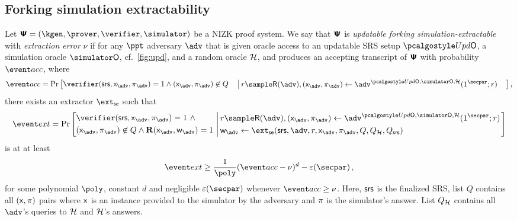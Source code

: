 \subsection{Forking simulation extractability}
\begin{definition}
	\label{def:updsimext}
	Let $\ps = (\kgen, \prover, \verifier, \simulator)$ be a
	NIZK proof system. We say that $\bm{\mathsf{\Psi}}$ is \emph{updatable forking
		simulation-extractable} with \emph{extraction error} $\nu$ if for any $\ppt$
	adversary $\adv$ that is given oracle access to an updatable SRS setup $\initU$, a simulation oracle $\simO$, cf.~\cref{fig:upd}, and a random oracle $\mathcal{H}$, and produces an accepting transcript of $\bm{\mathsf{\Psi}}$ with
	probability $\accProb$, where
	\[
	\accProb = \Pr \left[
	\begin{aligned}
	& \verifier(\srs, \inp_{\advse}, \zkproof_{\advse}) = 1 \wedge
	(\inp_{\advse}, \zkproof_{\advse}) \not\in Q
	\end{aligned}
	\left| \,
	\begin{aligned}
	& r \sample \RND{\advse},
	(\inp_{\advse}, \zkproof_{\advse}) \gets \advse^{\initU, \simO,
		\ro} (1^\secpar; r)
	\end{aligned}
	\right.\right],
	\]
	there exists an extractor $\extse$ such that
	\[
	\extProb = \Pr \left[
	\begin{aligned}
	& \verifier(\srs, \inp_{\advse}, \zkproof_{\advse}) = 1 \ \wedge \\
	& (\inp_{\advse}, \zkproof_{\advse}) \not\in Q \wedge
	\REL(\inp_{\advse}, \wit_{\advse}) = 1
	\end{aligned}
	\, \left| \,
	\begin{aligned}
	& r \sample \RND{\advse},
	(\inp_{\advse}, \zkproof_{\advse}) \gets \advse^{\initU, \simO,
		\ro} (1^\secpar; r) \\
	& \wit_{\advse} \gets \ext_\se (\srs, \advse, r, \inp_{\advse}, \zkproof_{\advse},
	Q, Q_\ro, Q_\srs) 
	\end{aligned}
	\right.\right]
	\]
	is at at least 
	\[
	\extProb \geq \frac{1}{\poly} (\accProb - \nu)^d - \eps(\secpar)\,,
	\]
	for some polynomial $\poly$, constant $d$ and negligible $\eps(\secpar)$ whenever
	$\accProb \geq \nu$. 
	Here, $\mathsf{srs}$ is the finalized SRS, list $Q$ contains all $(\mathsf{x}, \pi)$ pairs where 
	$\mathsf{x}$ is an instance provided to the simulator by the adversary and
	$\pi$ is the simulator's answer. List $Q_{\mathcal{H}}$ contains all $\advse$'s
	queries to $\mathcal{H}$ and $\mathcal{H}$'s answers. 
\end{definition}

